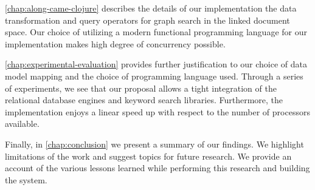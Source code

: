 		\cref{chap:along-came-clojure} describes the details of our implementation the data transformation and query operators for graph search in the linked document space.  Our choice of utilizing a modern functional programming language for our implementation makes high degree of concurrency possible.
		
		\cref{chap:experimental-evaluation} provides further justification to our choice of data model mapping and the choice of programming language used.  Through a series of experiments, we see that our proposal allows a tight integration of the relational database engines and keyword search libraries.  Furthermore, the implementation enjoys a linear speed up with respect to the number of processors available.
		
		Finally, in \cref{chap:conclusion} we present a summary of our findings.  We highlight limitations of the work and suggest topics for future research.  We provide an account of the various lessons learned while performing this research and building the system.